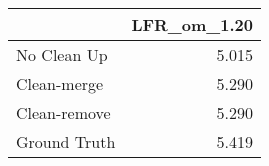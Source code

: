 \begin{tabular}{lr}
\toprule
{} & LFR_om_1.20 \\
\midrule
No Clean Up  &       5.015 \\
Clean-merge  &       5.290 \\
Clean-remove &       5.290 \\
Ground Truth &       5.419 \\
\bottomrule
\end{tabular}
